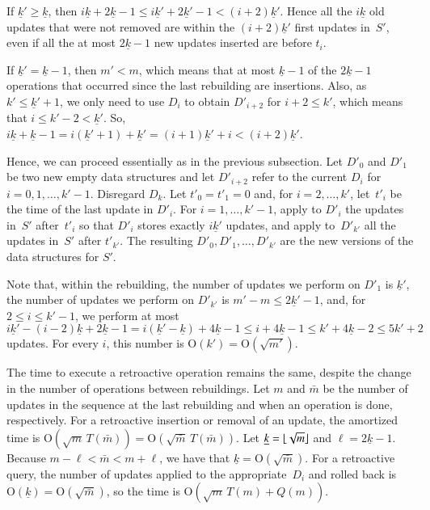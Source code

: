 \documentclass[3p,times,procedia]{elsarticle}
\DeclarePairedDelimiter\floor{\lfloor}{\rfloor}
\newcommand{\Oh}{\mathrm{O}}
\begin{document}
If $\underline{k}' \geq \underline{k}$, then
$i\underline{k}+2\underline{k}-1 \leq i\underline{k}'+2\underline{k}'-1 < (i+2)\underline{k}'$.
Hence all the $i\underline{k}$ old updates that were not removed 
are within the $(i+2)\underline{k}'$ first updates in~$S'$, 
even if all the at most $2\underline{k}-1$ new updates inserted are before $t_i$. 

If $\underline{k}' = \underline{k}-1$, then $m'<m$, 
which means that at most $\underline{k}-1$ of the $2\underline{k}-1$ 
operations that occurred since the last rebuilding are insertions. 
Also, as $k' \leq \underline{k}'+1$, 
we only need to use $D_i$ to obtain $D'_{i+2}$ for $i+2 \leq k'$, 
which means that $i \leq k'-2 < \underline{k}'$.  
So, $i\underline{k}+\underline{k}-1 = i(\underline{k}'+1)+\underline{k}' 
= (i+1)\underline{k}'+i <  (i+2)\underline{k}'$. 

Hence, we can proceed essentially as in the previous subsection.
Let $D'_0$ and $D'_1$ be two new empty data structures 
and let $D'_{i+2}$ refer to the current $D_i$ for~$i=0,1,\ldots,k'-1$.  Disregard $D_k$.   
Let $t'_0 = t'_1 = 0$ and, for $i=2,\ldots,k'$, 
let~$t'_i$ be the time of the last update in $D'_i$.
For $i=1,\ldots,k'-1$, apply to $D'_i$ the updates in~$S'$ 
after~$t'_i$ so that $D'_i$ stores exactly $i\underline{k}'$ updates, 
and apply to~$D'_{k'}$ all the updates in~$S'$ after $t'_{k'}$. 
The resulting $D'_0,D'_1,\ldots,D'_{k'}$ are the new versions of the data structures for $S'$. 

Note that, within the rebuilding, 
the number of updates we perform on $D'_1$ is $\underline{k}'$, 
the number of updates we perform on $D'_{k'}$ is $m'-m \leq 2\underline{k}'-1$, 
and, for $2 \leq i \leq k'-1$, we perform at most 
$i\underline{k}' - (i-2)\underline{k}+2\underline{k}-1
 = i(\underline{k}'-\underline{k})+4\underline{k}-1 
\leq i+4\underline{k}-1 \leq k'+4\underline{k}-2 \leq 5k'+2$ updates. 
For every $i$, this number is $\Oh(k') = \Oh(\sqrt{m'})$.


The time to execute a retroactive operation remains the same, 
despite the change in the number of operations between rebuildings.
Let $m$ and $\bar{m}$ be the number of updates in the sequence at 
the last rebuilding and when an operation is done, respectively.
For a retroactive insertion or removal of an update, the amortized time 
is $\Oh(\sqrt{m}\,T(\bar{m})) = \Oh(\sqrt{\bar{m}}\,T(\bar{m}))$.  
Let $\underline{k} = \floor{\sqrt{m}}$ and $\ell = 2\underline{k}-1$. 
Because $m-\ell < \bar{m} < m+\ell$, we have that $\underline{k} = \Oh(\sqrt{\bar{m}})$. 
For a retroactive query, the number of updates applied to the 
appropriate~$D_i$ and rolled back is $\Oh(\underline{k}) = \Oh(\sqrt{\bar{m}})$, 
so the time is $\Oh(\sqrt{m}\,T(m)+Q(m))$.  
\end{document}
